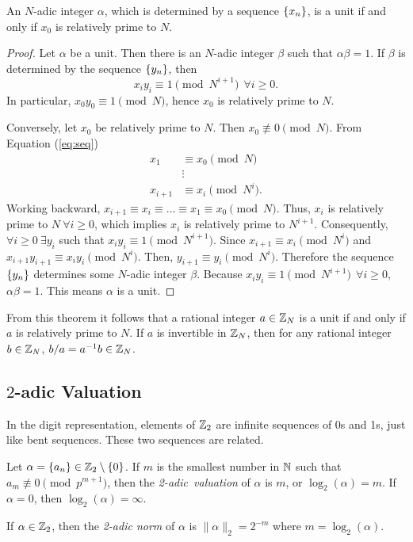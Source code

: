 \begin{theorem}\label{thm:units}
  An $N$-adic integer $\alpha$, which is determined by a sequence $\{x_n\}$, is
  a unit if and only if $x_0$ is relatively prime to $N$.
\end{theorem}
\begin{proof}
  Let $\alpha$ be a unit. Then there is an $N$-adic integer $\beta$ such
  that $\alpha\beta=1$. If $\beta$ is determined by the sequence $\{y_n\}$, then
  \begin{equation}\label{eq:units}
    x_iy_i\equiv1\pmod{N^{i+1}} \ \ \forall i \geq 0.
  \end{equation}
  In particular, $x_0y_0\equiv1\pmod N$, hence $x_0$ is relatively prime to
  $N$. 
  \par Conversely, let $x_0$ be relatively prime to $N$. Then
  $x_0\not\equiv0\pmod{N}$. From Equation (\ref{eq:seq})
  \begin{align*}
    x_1 &\equiv x_0 \pmod N\\
    &\vdots \\
    x_{i+1} &\equiv x_i \pmod{N^i}. 
  \end{align*}
  Working backward, $x_{i+1} \equiv x_i \equiv \dots \equiv x_1 \equiv
  x_0 \pmod N$. Thus, $x_i$ is relatively prime to $N \ \forall i\geq0$,
  which implies $x_i$ is relatively prime to $N^{i+1}$. Consequently,
  $\forall i\geq0 \ \exists y_i$ such that $x_iy_i \equiv 1 \pmod{N^{i+1}}$.
  Since $x_{i+1} \equiv x_i \pmod N^i$ and $x_{i+1}y_{i+1} \equiv
  x_iy_i \pmod{N^i}$. Then, $y_{i+1} \equiv y_i \pmod{N^i}$. Therefore the
  sequence $\{y_n\}$ determines some $N$-adic integer $\beta$. Because
  $x_iy_i \equiv 1 \pmod{N^{i+1}} \ \ \forall i \geq 0$, $\alpha\beta=1$.
  This means $\alpha$ is a unit.
\end{proof}

\par From this theorem it follows that a rational integer $a\in\mathbb{Z}_N$ is a
unit if and only if $a$ is relatively prime to $N$. If $a$ is invertible in
$\mathbb{Z}_N$, then for any rational integer $b\in\mathbb{Z}_N$, $b/a=a^{-1}b\in\mathbb{Z}_N$.


\subsection{$2$-adic Valuation}
\par In the digit representation, elements of $\mathbb{Z}_2$ are infinite
sequences of 0s and 1s, just like bent sequences. These two sequences are
related.

\begin{definition}\label{2-adic-val}
  Let $\alpha=\{a_n\}\in\mathbb{Z}_2\setminus\{0\}$. If $m$ is the smallest
  number in $\mathbb{N}$ such that $a_m \not\equiv 0 \pmod p^{m+1}$,
	then the {\em 2-adic\ valuation} of $\alpha$ is $m$, or
  $\log_2(\alpha)=m$. If $\alpha=0$, then $\log_2(\alpha)=\infty$.
\end{definition}

\begin{definition}\label{2-adic-norm}
	If $\alpha \in \mathbb{Z}_2$, then the {\em 2-adic norm} of $\alpha$ is
  $\lVert \alpha \rVert_2 = 2^{-m}$ where $m=\log_2(\alpha)$. 
\end{definition}
